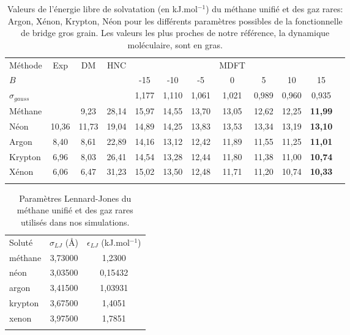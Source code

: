 \begin{table}[ht]
  \centering
  \begin{tabular}{l c c c c c c c c c c c}
   \hline & \\[-1em]\hline
    Méthode    & Exp   & DM    & HNC    &      &       &       & MDFT  &       &       & \\
    \hline
    $B$          &       &       &        & -15   & -10   & -5    & 0     & 5     & 10    & 15     \\
    $\sigma_{gauss}$   &       &       &        & 1,177 & 1,110 & 1,061 & 1,021 & 0,989 & 0,960 & 0,935  \\
    \hline
    Méthane    &       &  9,23 & 28,14  & 15,97 & 14,55 & 13,70 & 13,05 & 12,62 & 12,25 & \textbf{11,99}  \\
    Néon       & 10,36 & 11,73 & 19,04  & 14,89 & 14,25 & 13,83 & 13,53 & 13,34 & 13,19 & \textbf{13,10}  \\
    Argon      &  8,40 &  8,61 & 22,89  & 14,16 & 13,12 & 12,42 & 11,89 & 11,55 & 11,25 & \textbf{11,01}  \\
    Krypton    &  6,96 &  8,03 & 26,41  & 14,54 & 13,28 & 12,44 & 11,80 & 11,38 & 11,00 & \textbf{10,74}  \\
    Xénon       &  6,06 &  6,47 & 31,23 & 15,02 & 13,50 & 12,48 & 11,71 & 11,20 & 10,74 & \textbf{10,33}  \\
    \hline & \\[-1em]\hline
  \end{tabular}
  \caption[\'Energie libre de solvatation du méthane unifié et des gaz rares.]{Valeurs de l'énergie libre de solvatation (en kJ.mol$^{-1}$) du méthane unifié et des gaz rares: Argon, Xénon, Krypton, Néon pour les différents paramètres possibles de la fonctionnelle de bridge gros grain. Les valeurs les plus proches de notre référence, la dynamique moléculaire, sont en gras.}
  \label{tab:energie_libre_molecules_models}  
\end{table}


\begin{table}[ht]
  \centering
  \begin{tabular}{l c c}
   \hline & \\[-1em]\hline
    Soluté    & $\sigma_{LJ}$ (\AA) & $\epsilon_{LJ}$ (kJ.mol$^{-1}$) \\
    \hline
      méthane & 3,73000 & 1,2300 \\
	  néon & 3,03500 & 0,15432 \\
	  argon & 3,41500 & 1,03931 \\
	  krypton & 3,67500 & 1,4051 \\
	  xenon & 3,97500 & 1,7851 \\
    \hline & \\[-1em]\hline
  \end{tabular}
  \caption[Paramètres Lennard-Jones du méthane unifié et des gaz rares utilisés dans nos simulations.]{Paramètres Lennard-Jones du méthane unifié et des gaz rares utilisés dans nos simulations.}
  \label{tab:param_lj}  
\end{table}


